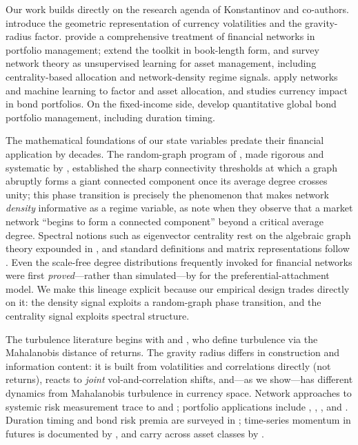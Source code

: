 \documentclass[12pt]{article}
\begin{document}
Our work builds directly on the research agenda of Konstantinov and co-authors. \citet{konstantinov2022geometry} introduce the geometric representation of currency volatilities and the gravity-radius factor. \citet{konstantinov2023networks} provide a comprehensive treatment of financial networks in portfolio management; \citet{konstantinov2025networkmodels} extend the toolkit in book-length form, and \citet{konstantinov2025unsupervised} survey network theory as unsupervised learning for asset management, including centrality-based allocation and network-density regime signals. \citet{konstantinov2020network} apply networks and machine learning to factor and asset allocation, and \citet{konstantinov2022embonds} studies currency impact in bond portfolios. On the fixed-income side, \citet{konstantinov2023qgbpm} develop quantitative global bond portfolio management, including duration timing.

The mathematical foundations of our state variables predate their financial application by decades. The random-graph program of \citet{erdos1960evolution}, made rigorous and systematic by \citet{bollobas2001random}, established the sharp connectivity thresholds at which a graph abruptly forms a giant connected component once its average degree crosses unity; this phase transition is precisely the phenomenon that makes network \emph{density} informative as a regime variable, as \citet{konstantinov2025unsupervised} note when they observe that a market network ``begins to form a connected component'' beyond a critical average degree. Spectral notions such as eigenvector centrality rest on the algebraic graph theory expounded in \citet{bollobas1998modern}, and standard definitions and matrix representations follow \citet{gross2019graph}. Even the scale-free degree distributions frequently invoked for financial networks were first \emph{proved}---rather than simulated---by \citet{bollobas2001scalefree} for the preferential-attachment model. We make this lineage explicit because our empirical design trades directly on it: the density signal exploits a random-graph phase transition, and the centrality signal exploits spectral structure.

The turbulence literature begins with \citet{chow1999optimal} and \citet{kritzman2010skulls}, who define turbulence via the Mahalanobis distance of returns. The gravity radius differs in construction and information content: it is built from volatilities and correlations directly (not returns), reacts to \emph{joint} vol-and-correlation shifts, and---as we show---has different dynamics from Mahalanobis turbulence in currency space. Network approaches to systemic risk measurement trace to \citet{billio2012econometric} and \citet{diebold2015connectedness}; portfolio applications include \citet{peralta2016network}, \citet{zareei2019network}, \citet{raffinot2018hierarchical}, and \citet{ciciretti2024network}. Duration timing and bond risk premia are surveyed in \citet{ilmanen2011expected}; time-series momentum in futures is documented by \citet{moskowitz2012time}, and carry across asset classes by \citet{koijen2018carry}.
\end{document}
